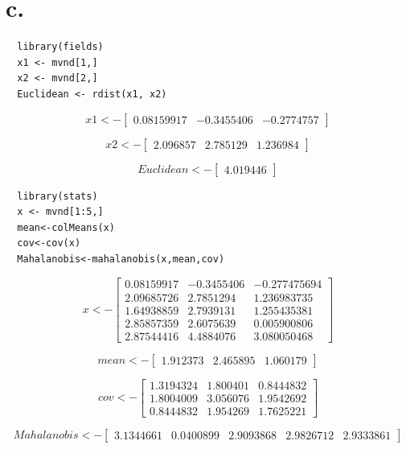 \documentclass{report}
\begin{document}
\section{c.}

\begin{verbatim}
  library(fields)
  x1 <- mvnd[1,]
  x2 <- mvnd[2,]
  Euclidean <- rdist(x1, x2)
\end{verbatim}

\[
  x1 <-
  \begin{bmatrix}
    0.08159917 & -0.3455406 & -0.2774757
  \end{bmatrix}
\]

\[
  x2 <-
  \begin{bmatrix}
    2.096857 & 2.785129 & 1.236984
  \end{bmatrix}
\]

\[
  Euclidean <-
  \begin{bmatrix}
    4.019446
  \end{bmatrix}
\]

\begin{verbatim}
  library(stats)
  x <- mvnd[1:5,]
  mean<-colMeans(x)
  cov<-cov(x)
  Mahalanobis<-mahalanobis(x,mean,cov) 
\end{verbatim}

\[
  x <-
  \begin{bmatrix}
    0.08159917 & -0.3455406 & -0.277475694 \\
    2.09685726 & 2.7851294 & 1.236983735 \\
    1.64938859 & 2.7939131 & 1.255435381 \\
    2.85857359 & 2.6075639 & 0.005900806 \\
    2.87544416 & 4.4884076 & 3.080050468
  \end{bmatrix}
\]

\[
  mean <-
  \begin{bmatrix}
    1.912373 & 2.465895 & 1.060179
  \end{bmatrix}
\]

\[
  cov <-
  \begin{bmatrix}
    1.3194324 & 1.800401 & 0.8444832 \\
    1.8004009 & 3.056076 & 1.9542692 \\
    0.8444832 & 1.954269 & 1.7625221
  \end{bmatrix}
\]

\[
  Mahalanobis <-
  \begin{bmatrix}
    3.1344661 & 0.0400899 & 2.9093868 & 2.9826712 & 2.9333861
  \end{bmatrix}
\]
\end{document}
